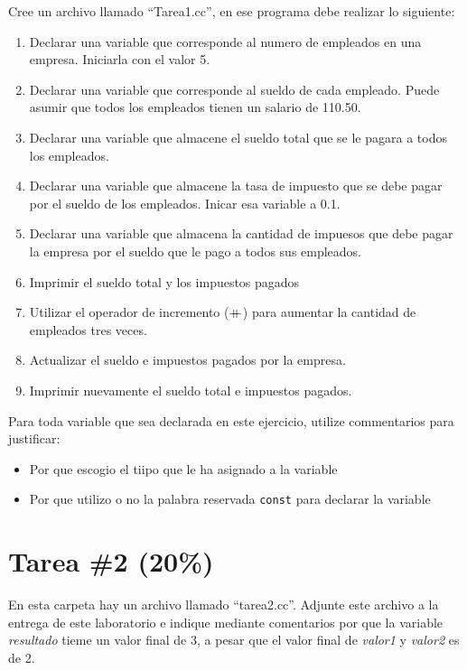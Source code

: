 \documentclass{article}
\newcommand\doubleplus{\ensuremath{\mathbin{+\mkern-10mu+}}}
\begin{document}
Cree un archivo llamado ``Tarea1.cc'', en ese programa debe realizar lo siguiente:
\begin{enumerate}
    \item{Declarar una variable que corresponde al numero de empleados en una empresa.
    Iniciarla con el valor 5.}
    \item{Declarar una variable que corresponde al sueldo de cada empleado. Puede asumir
    que todos los empleados tienen un salario de 110.50.}
    \item{Declarar una variable que almacene el sueldo total que se le pagara a todos
    los empleados.}
    \item{Declarar una variable que almacene la tasa de impuesto que se debe pagar
    por el sueldo de los empleados. Inicar esa variable a 0.1.}
    \item{Declarar una variable que almacena la cantidad de impuesos que debe pagar
    la empresa por el sueldo que le pago a todos sus empleados.}
    \item{Imprimir el sueldo total y los impuestos pagados}
    \item{Utilizar el operador de incremento ($\doubleplus$) para aumentar la cantidad
    de empleados tres veces.}
    \item{Actualizar el sueldo e impuestos pagados por la empresa.}
    \item{Imprimir nuevamente el sueldo total e impuestos pagados.}
\end{enumerate}
Para toda variable que sea declarada en este ejercicio, utilize commentarios para justificar:
\begin{itemize}
    \item{Por que escogio el tiipo que le ha asignado a la variable}
    \item{Por que utilizo o no la palabra reservada \texttt{const} para declarar la variable}
\end{itemize}

\section*{Tarea \#2 (20\%)}
En esta carpeta hay un archivo llamado ``tarea2.cc''. Adjunte este archivo a la entrega
de este laboratorio e indique mediante comentarios por que la variable \emph{resultado}
tieme un valor final de 3, a pesar que el valor final de \emph{valor1} y \emph{valor2}
es de 2.
\end{document}
